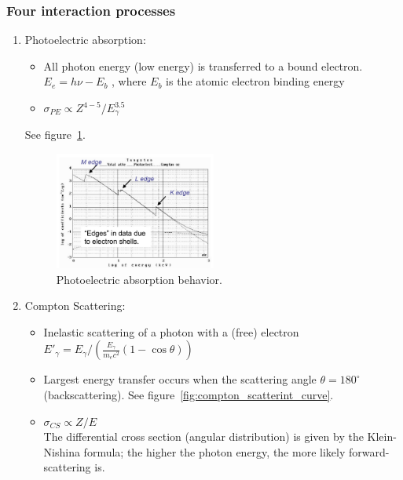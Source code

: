 \subsubsection{Four interaction processes}
\begin{enumerate}
    \item Photoelectric absorption:
    \begin{itemize}
        \item All photon energy (low energy) is transferred to a bound electron.\\
        $E_e=h\nu-E_b$ , where $E_b$ is the atomic electron binding energy
        \item $\sigma_{PE}\propto Z^{4-5}/E_\gamma^{3.5}$
    \end{itemize}
    See figure~\ref{fig:photoelectric_absorption_edges}.
    \begin{figure}[ht]
        \centering
        \includegraphics[width=0.5\textwidth]{images/photoelectric_absorption_edges.png}
        \caption{Photoelectric absorption behavior.}
        \label{fig:photoelectric_absorption_edges}
    \end{figure}
    \item Compton Scattering:
    \begin{itemize}
        \item Inelastic scattering of a photon with a (free) electron\\
        $E'_\gamma=E_\gamma/\left(\frac{E_\gamma}{m_ec^2}(1-\cos\theta)\right)$
        \item Largest energy transfer occurs when the scattering angle $\theta=180^\circ$ (backscattering). See figure~\ref{fig:compton_scatterint_curve}.
        \item $\sigma_{CS}\propto Z/E$\\
        The differential cross section (angular distribution) is given by the Klein-Nishina formula; the higher the photon energy, the more likely forward-scattering is.
    \end{itemize}
    \begin{figure}[ht]

\end{figure}
\end{enumerate}
